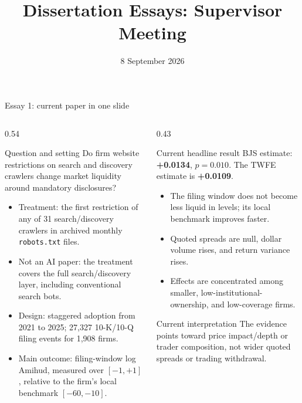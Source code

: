 \documentclass[aspectratio=169,10pt]{beamer}
\title[Dissertation Essays]{Dissertation Essays: Supervisor Meeting}
\author{}
\institute{}
\date{8 September 2026}
\newcommand{\tightitems}{\setlength\itemsep{0.11cm}\setlength\parskip{0pt}}
\begin{document}
\begin{frame}[t]{Essay 1: current paper in one slide}
\begin{columns}[T,onlytextwidth]
  \begin{column}{0.54\textwidth}
    \begin{block}{Question and setting}
      Do firm website restrictions on search and discovery crawlers change market liquidity around mandatory disclosures?
    \end{block}
    \footnotesize
    \begin{itemize}\tightitems
      \item Treatment: the first restriction of any of 31 search/discovery crawlers in archived monthly \texttt{robots.txt} files.
      \item Not an AI paper: the treatment covers the full search/discovery layer, including conventional search bots.
      \item Design: staggered adoption from 2021 to 2025; 27,327 10-K/10-Q filing events for 1,908 firms.
      \item Main outcome: filing-window log Amihud, measured over $[-1,+1]$, relative to the firm's local benchmark $[-60,-10]$.
    \end{itemize}
  \end{column}
  \begin{column}{0.43\textwidth}
    \begin{alertblock}{Current headline result}
      BJS estimate: \textbf{+0.0134}, $p=0.010$. The TWFE estimate is \textbf{+0.0109}.
    \end{alertblock}
    \footnotesize
    \begin{itemize}\tightitems
      \item The filing window does not become less liquid in levels; its local benchmark improves faster.
      \item Quoted spreads are null, dollar volume rises, and return variance rises.
      \item Effects are concentrated among smaller, low-institutional-ownership, and low-coverage firms.
    \end{itemize}
    \begin{exampleblock}{Current interpretation}
      \footnotesize
      The evidence points toward price impact/depth or trader composition, not wider quoted spreads or trading withdrawal.
    \end{exampleblock}
  \end{column}
\end{columns}
\end{frame}
\end{document}
